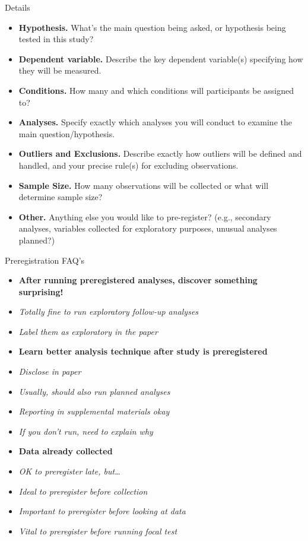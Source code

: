\documentclass[
  ignorenonframetext,
  aspectratio=169,
]{beamer}
\providecommand{\tightlist}{%
  \setlength{\itemsep}{0pt}\setlength{\parskip}{0pt}}\usepackage{longtable,booktabs,array}
\begin{document}
\begin{frame}{Details}
\label{details}
\begin{itemize}
\tightlist
\item
  \textbf{Hypothesis.} What's the main question being asked, or
  hypothesis being tested in this study?
\item
  \textbf{Dependent variable.} Describe the key dependent variable(s)
  specifying how they will be measured.
\item
  \textbf{Conditions.} How many and which conditions will participants
  be assigned to?
\item
  \textbf{Analyses.} Specify exactly which analyses you will conduct to
  examine the main question/hypothesis.
\item
  \textbf{Outliers and Exclusions.} Describe exactly how outliers will
  be defined and handled, and your precise rule(s) for excluding
  observations.
\item
  \textbf{Sample Size.} How many observations will be collected or what
  will determine sample size?
\item
  \textbf{Other.} Anything else you would like to pre-register? (e.g.,
  secondary analyses, variables collected for exploratory purposes,
  unusual analyses planned?)
\end{itemize}
\end{frame}

\begin{frame}{Preregistration FAQ's}
\label{preregistration-faqs}
\begin{itemize}
\tightlist
\item
  \textbf{After running preregistered analyses, discover something
  surprising!}
\item
  \emph{Totally fine to run exploratory follow-up analyses}
\item
  \emph{Label them as exploratory in the paper}
\item
  \textbf{Learn better analysis technique after study is preregistered}
\item
  \emph{Disclose in paper}
\item
  \emph{Usually, should also run planned analyses}
\item
  \emph{Reporting in supplemental materials okay}
\item
  \emph{If you don't run, need to explain why}
\item
  \textbf{Data already collected}
\item
  \emph{OK to preregister late, but\ldots{}}
\item
  \emph{Ideal to preregister before collection}
\item
  \emph{Important to preregister before looking at data}
\item
  \emph{Vital to preregister before running focal test}
\end{itemize}
\end{frame}
\end{document}
